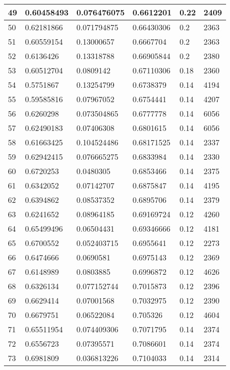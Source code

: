 \begin{longtable}{|l|l|l|l|l|l|}
49 & 0.60458493 & 0.076476075 & 0.6612201 & 0.22 & 2409 \\ \hline 
50 & 0.62181866 & 0.071794875 & 0.66430306 & 0.2 & 2363 \\ \hline 
51 & 0.60559154 & 0.13000657 & 0.6667704 & 0.2 & 2363 \\ \hline 
52 & 0.6136426 & 0.13318788 & 0.66905844 & 0.2 & 2380 \\ \hline 
53 & 0.60512704 & 0.0809142 & 0.67110306 & 0.18 & 2360 \\ \hline 
54 & 0.5751867 & 0.13254799 & 0.6738379 & 0.14 & 4194 \\ \hline 
55 & 0.59585816 & 0.07967052 & 0.6754441 & 0.14 & 4207 \\ \hline 
56 & 0.6260298 & 0.073504865 & 0.6777778 & 0.14 & 6056 \\ \hline 
57 & 0.62490183 & 0.07406308 & 0.6801615 & 0.14 & 6056 \\ \hline 
58 & 0.61663425 & 0.104524486 & 0.68171525 & 0.14 & 2337 \\ \hline 
59 & 0.62942415 & 0.076665275 & 0.6833984 & 0.14 & 2330 \\ \hline 
60 & 0.6720253 & 0.0480305 & 0.6853466 & 0.14 & 2375 \\ \hline 
61 & 0.6342052 & 0.07142707 & 0.6875847 & 0.14 & 4195 \\ \hline 
62 & 0.6394862 & 0.08537352 & 0.6895706 & 0.14 & 2379 \\ \hline 
63 & 0.6241652 & 0.08964185 & 0.69169724 & 0.12 & 4260 \\ \hline 
64 & 0.65499496 & 0.06504431 & 0.69346666 & 0.12 & 4181 \\ \hline 
65 & 0.6700552 & 0.052403715 & 0.6955641 & 0.12 & 2273 \\ \hline 
66 & 0.6474666 & 0.0690581 & 0.6975143 & 0.12 & 2369 \\ \hline 
67 & 0.6148989 & 0.0803885 & 0.6996872 & 0.12 & 4626 \\ \hline 
68 & 0.6326134 & 0.077152744 & 0.7015873 & 0.12 & 2396 \\ \hline 
69 & 0.6629414 & 0.07001568 & 0.7032975 & 0.12 & 2390 \\ \hline 
70 & 0.6679751 & 0.06522084 & 0.705326 & 0.12 & 4604 \\ \hline 
71 & 0.65511954 & 0.074409306 & 0.7071795 & 0.14 & 2374 \\ \hline 
72 & 0.6556723 & 0.07395571 & 0.7086601 & 0.14 & 2374 \\ \hline 
73 & 0.6981809 & 0.036813226 & 0.7104033 & 0.14 & 2314 \\ \hline 

\end{longtable}
